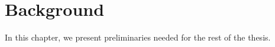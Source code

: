 \chapter{Background}
In this chapter, we present preliminaries needed for the rest of the thesis.
\label{chap:background}



